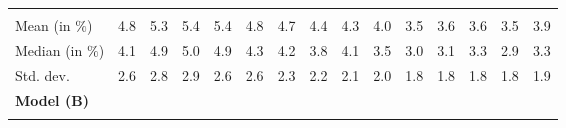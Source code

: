 \begin{tabular}{lllllllllllllll}
  \multicolumn{1}{|r}{} &
  \multicolumn{1}{r}{} &
  \multicolumn{1}{r}{} &
  \multicolumn{1}{r}{} &
  \multicolumn{1}{r}{} &
  \multicolumn{1}{r}{} &
  \multicolumn{1}{r}{} &
  \multicolumn{1}{r}{} &
  \multicolumn{1}{r}{} &
  \multicolumn{1}{r}{} &
  \multicolumn{1}{r}{} &
  \multicolumn{1}{r}{} &
  \multicolumn{1}{r}{} &
  \multicolumn{1}{r}{} \\
\multicolumn{1}{l}{\hspace{2em}Mean (in $\%$)} &
  \multicolumn{1}{|r}{4.8} &
  \multicolumn{1}{r}{5.3} &
  \multicolumn{1}{r}{5.4} &
  \multicolumn{1}{r}{5.4} &
  \multicolumn{1}{r}{4.8} &
  \multicolumn{1}{r}{4.7} &
  \multicolumn{1}{r}{4.4} &
  \multicolumn{1}{r}{4.3} &
  \multicolumn{1}{r}{4.0} &
  \multicolumn{1}{r}{3.5} &
  \multicolumn{1}{r}{3.6} &
  \multicolumn{1}{r}{3.6} &
  \multicolumn{1}{r}{3.5} &
  \multicolumn{1}{r}{3.9} \\
\multicolumn{1}{l}{\hspace{2em}Median (in $\%$)} &
  \multicolumn{1}{|r}{4.1} &
  \multicolumn{1}{r}{4.9} &
  \multicolumn{1}{r}{5.0} &
  \multicolumn{1}{r}{4.9} &
  \multicolumn{1}{r}{4.3} &
  \multicolumn{1}{r}{4.2} &
  \multicolumn{1}{r}{3.8} &
  \multicolumn{1}{r}{4.1} &
  \multicolumn{1}{r}{3.5} &
  \multicolumn{1}{r}{3.0} &
  \multicolumn{1}{r}{3.1} &
  \multicolumn{1}{r}{3.3} &
  \multicolumn{1}{r}{2.9} &
  \multicolumn{1}{r}{3.3} \\
\multicolumn{1}{l}{\hspace{2em}Std. dev.} &
  \multicolumn{1}{|r}{2.6} &
  \multicolumn{1}{r}{2.8} &
  \multicolumn{1}{r}{2.9} &
  \multicolumn{1}{r}{2.6} &
  \multicolumn{1}{r}{2.6} &
  \multicolumn{1}{r}{2.3} &
  \multicolumn{1}{r}{2.2} &
  \multicolumn{1}{r}{2.1} &
  \multicolumn{1}{r}{2.0} &
  \multicolumn{1}{r}{1.8} &
  \multicolumn{1}{r}{1.8} &
  \multicolumn{1}{r}{1.8} &
  \multicolumn{1}{r}{1.8} &
  \multicolumn{1}{r}{1.9} \\
\multicolumn{1}{l}{{\textbf{Model (B)}}} &
  \multicolumn{1}{|r}{} &
  \multicolumn{1}{r}{} &
  \multicolumn{1}{r}{} &
  \multicolumn{1}{r}{} &
  \multicolumn{1}{r}{} &
  \multicolumn{1}{r}{} &
  \multicolumn{1}{r}{} &
  \multicolumn{1}{r}{} &
  \multicolumn{1}{r}{} &
  \multicolumn{1}{r}{} &
  \multicolumn{1}{r}{} &
  \multicolumn{1}{r}{} &
  \multicolumn{1}{r}{} &
  \multicolumn{1}{r}{} \\
\multicolumn{1}{l}{\hspace{1em}{\textit{Mult. term} ($\widehat{\tau}^{adv}$)}} &
  \multicolumn{1}{|r}{} &
  \multicolumn{1}{r}{} &
  \multicolumn{1}{r}{} &
  \multicolumn{1}{r}{} &

\end{tabular}
